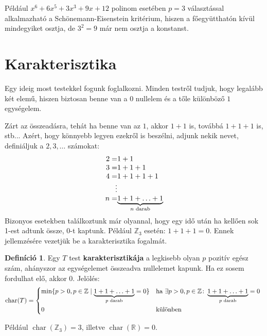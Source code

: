\documentclass[12pt]{book}
\theoremstyle{plain} %
\theoremstyle{definition} %
\newtheorem{defi/}{Definíció}[section]
\newenvironment{defi}
  {\renewcommand{\qedsymbol}{$\clubsuit$}%
   \pushQED{\qed}\begin{defi/}}
  {\popQED\end{defi/}}
\theoremstyle{remark}
\renewcommand\qedsymbol{$\blacksquare$}
\newcommand\cha{\operatorname{char}}
\numberwithin{equation}{section}  %
\begin{document}
	Például $x^6+6x^5+3x^3+9x+12$ polinom esetében $p=3$ választással alkalmazható a Schönemann-Eisenstein kritérium, hiszen a főegyütthatón kívül mindegyiket osztja, de $3^2=9$ már nem osztja a konstanst.
	
	
	\section{Karakterisztika}
	Egy ideig most testekkel fogunk foglalkozni. Minden testről tudjuk, hogy legalább két elemű, hiszen biztosan benne van a $0$ nullelem és a tőle különböző $1$ egységelem.
	
	Zárt az összeadásra, tehát ha benne van az $1$, akkor $1+1$ is, továbbá $1+1+1$ is, stb... Azért, hogy könnyebb legyen ezekről is beszélni, adjunk nekik nevet, definiáljuk a $2,3,\ldots$ számokat:
	\[
	\setlength\arraycolsep{0pt}
	\begin{array}{r l}
	2 = & 1+1 \\
	3 = & 1+1+1 \\
	4 = & 1+1+1+1 \\ 
	\vdots \\
	n = & \underbrace{1+1+\ldots+1}_{n \text{ darab}}
	\end{array}
	\]
	Bizonyos esetekben találkoztunk már olyannal, hogy egy idő után ha kellően sok 1-est adtunk össze, 0-t kaptunk. Például $\mathbb{Z}_3$ esetén: $1+1+1=0$. Ennek jellemzésére vezetjük be a karakterisztika fogalmát.
	\begin{defi}
		Egy $T$ test \textbf{karakterisztikája} a legkisebb olyan $p$ pozitív egész szám, ahányszor az egységelemet összeadva nullelemet kapunk. Ha ez sosem fordulhat elő, akkor 0. Jelölés:
		\[ \cha(T) =
		\begin{cases*}
			\min\{ {p>0, p\in \mathbb{Z} \mid \underbrace{1+1+\ldots+1}_{p\text{ darab}} = 0} \} & ha $\exists p>0, p\in\mathbb{Z} \colon \underbrace{1+1+\ldots+1}_{p\text{ darab}} = 0$ \\
			0 & különben
		\end{cases*}
		  \]
	\end{defi}	
	Például $\cha(\mathbb{Z}_3)=3$, illetve $\cha(\mathbb{R})=0$.
	
\end{document}
